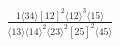\documentclass[varwidth, border=5pt]{standalone}
\begin{document}
\begin{my}
$\begin{gathered}
\scriptscriptstyle\frac{1⟨34⟩[12]^2⟨12⟩^3⟨15⟩}{⟨13⟩⟨14⟩^2⟨23⟩^2[25]^2⟨45⟩}
\end{gathered}$
\end{my}
\end{document}
